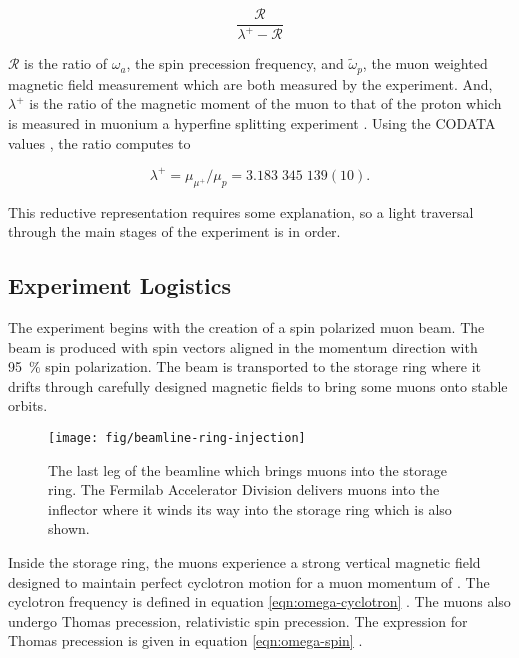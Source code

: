 \begin{equation}
\label{eqn:g-2-results-2}
\frac{\mathcal{R}}{\lambda^+ - \mathcal{R}}
\end{equation}

$\mathcal{R}$ is the ratio of $\omega_a$, the spin precession frequency, and $\tilde{\omega}_p$, the muon weighted magnetic field measurement which are both measured by the experiment. And, $\lambda^+$ is the ratio of the magnetic moment of the muon to that of the proton which is measured in muonium a hyperfine splitting experiment \cite{muonium-hyperfine}.  Using the CODATA values \cite{codata}, the ratio computes to

\begin{equation}
\label{eqn:muon-to-proton-mu-ratio}
\lambda^+ = \mu_{\mu^+} / \mu_p = 3.183\;345\;139(10).
\end{equation}

\noindent
This reductive representation requires some explanation, so a light traversal through the main stages of the experiment is in order.

\subsection{Experiment Logistics}
The experiment begins with the creation of a spin polarized muon beam.  The beam is produced with spin vectors aligned in the momentum direction with \SI{95}{\percent} spin polarization.  The beam is transported to the storage ring where it drifts through carefully designed magnetic fields to bring some muons onto stable orbits.

\begin{figure}
\label{fig:beamline-ring-injection}
\centering
\texttt{[image: fig/beamline-ring-injection]}
\caption{The last leg of the beamline which brings muons into the storage ring.  The Fermilab Accelerator Division delivers muons into the inflector where it winds its way into the storage ring which is also shown.}
\end{figure}

Inside the storage ring, the muons experience a strong vertical magnetic field designed to maintain perfect cyclotron motion for a muon momentum of \pmagic.  The cyclotron frequency is defined in equation \ref{eqn:omega-cyclotron} \cite{e821-prd}.  The muons also undergo Thomas precession, relativistic spin precession.  The expression for Thomas precession is given in equation \ref{eqn:omega-spin} \cite{e821-prd}.

